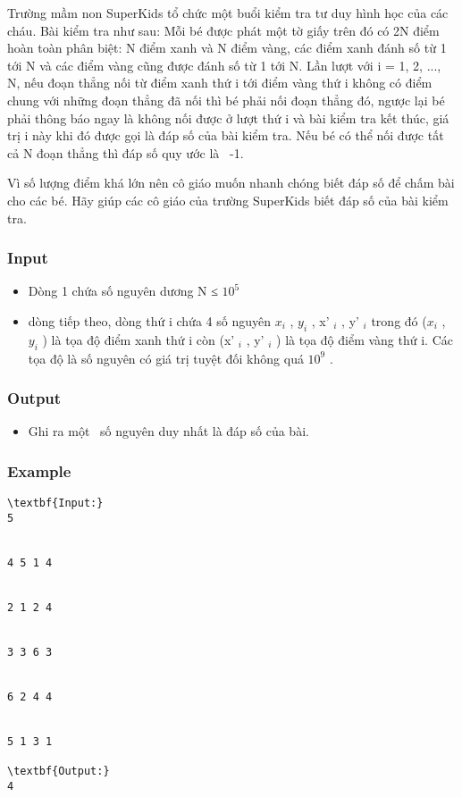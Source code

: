 



   Trường mầm non SuperKids tổ chức một buổi kiểm tra tư duy hình học của các cháu. Bài kiểm tra như sau: Mỗi bé được phát một tờ giấy trên đó có 2N điểm hoàn toàn phân biệt: N điểm xanh và N điểm vàng, các điểm xanh đánh số từ 1 tới N và các điểm vàng cũng được đánh số từ 1 tới N. Lần lượt với i = 1, 2, ..., N, nếu đoạn thẳng nối từ điểm xanh thứ i tới điểm vàng thứ i không có điểm chung với những đoạn thẳng đã nối thì bé phải nối đoạn thẳng đó, ngược lại bé phải thông báo ngay là không nối được ở lượt thứ i và bài kiểm tra kết thúc, giá trị i này khi đó được gọi là đáp số của bài kiểm tra. Nếu bé có thể nối được tất cả N đoạn thẳng thì đáp số quy ước là  -1.  

   Vì số lượng điểm khá lớn nên cô giáo muốn nhanh chóng biết đáp số để chấm bài cho các bé. Hãy giúp các cô giáo của trường SuperKids biết đáp số của bài kiểm tra.  

\subsubsection{   Input  }
\begin{itemize}
	\item     Dòng 1 chứa số nguyên dương N ≤ $10^{5}$
	\item     dòng tiếp theo, dòng thứ i chứa 4 số nguyên $x_{i}$    , $y_{i}$    , x'    $_     i    $    , y'    $_     i    $    trong đó ($x_{i}$    , $y_{i}$    ) là tọa độ điểm xanh thứ i còn (x'    $_     i    $    , y'    $_     i    $    ) là tọa độ điểm vàng thứ i. Các tọa độ là số nguyên có giá trị tuyệt đối không quá $10^{9}$    .   
\end{itemize}

\subsubsection{   Output  }
\begin{itemize}
	\item     Ghi ra một  số nguyên duy nhất là đáp số của bài.   
\end{itemize}

\subsubsection{   Example  }
\begin{verbatim}
\textbf{Input:}
5 


4 5 1 4 


2 1 2 4 


3 3 6 3 


6 2 4 4 


5 1 3 1

\textbf{Output:}
4
\end{verbatim}
